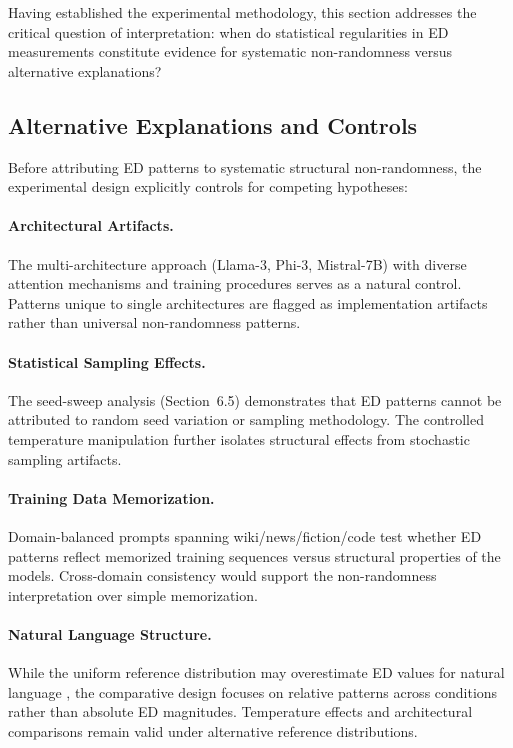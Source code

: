 \documentclass[12pt]{article}
\begin{document}
Having established the experimental methodology, this section addresses the critical question of interpretation: when do statistical regularities in ED measurements constitute evidence for systematic non-randomness versus alternative explanations?

\subsection{Alternative Explanations and Controls}

Before attributing ED patterns to systematic structural non-randomness, the experimental design explicitly controls for competing hypotheses:

\paragraph{Architectural Artifacts.}
The multi-architecture approach (Llama-3, Phi-3, Mistral-7B) with diverse attention mechanisms and training procedures serves as a natural control. Patterns unique to single architectures are flagged as implementation artifacts rather than universal non-randomness patterns.

\paragraph{Statistical Sampling Effects.}
The seed-sweep analysis (Section~6.5) demonstrates that ED patterns cannot be attributed to random seed variation or sampling methodology. The controlled temperature manipulation further isolates structural effects from stochastic sampling artifacts.

\paragraph{Training Data Memorization.}
Domain-balanced prompts spanning wiki/news/fiction/code test whether ED patterns reflect memorized training sequences versus structural properties of the models. Cross-domain consistency would support the non-randomness interpretation over simple memorization.

\paragraph{Natural Language Structure.}
While the uniform reference distribution may overestimate ED values for natural language \citep{zipf2016human, linders2020zipf}, the comparative design focuses on relative patterns across conditions rather than absolute ED magnitudes. Temperature effects and architectural comparisons remain valid under alternative reference distributions.
\end{document}
